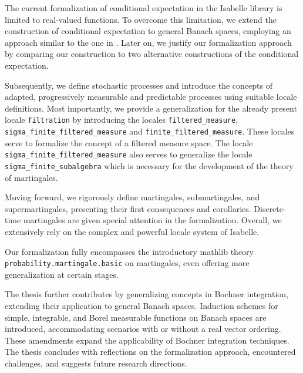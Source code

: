 The current formalization of conditional expectation in the Isabelle library is limited to real-valued functions. To overcome this limitation, we extend the construction of conditional expectation to general Banach spaces, employing an approach similar to the one in \cite{Hytoenen_2016}. Later on, we justify our formalization approach by comparing our construction to two alternative constructions of the conditional expectation.

Subsequently, we define stochastic processes and introduce the concepts of adapted, progressively measurable and predictable processes using suitable locale definitions. Most importantly, we provide a generalization for the already present locale \lstinline{filtration} by introducing the locales \lstinline{filtered_measure}, \lstinline{sigma_finite_filtered_measure} and  \lstinline{finite_filtered_measure}. These locales serve to formalize the concept of a filtered measure space. The locale \lstinline{sigma_finite_filtered_measure} also serves to generalize the locale \lstinline{sigma_finite_subalgebra} which is necessary for the development of the theory of martingales. 

Moving forward, we rigorously define martingales, submartingales, and supermartingales, presenting their first consequences and corollaries. Discrete-time martingales are given special attention in the formalization. Overall, we extensively rely on the complex and powerful locale system of Isabelle.

Our formalization fully encompasses the introductory \textsf{mathlib} theory \texttt{probability.mar\-tingale.basic} on martingales, even offering more generalization at certain stages.

The thesis further contributes by generalizing concepts in Bochner integration, extending their application to general Banach spaces. Induction schemes for simple, integrable, and Borel measurable functions on Banach spaces are introduced, accommodating scenarios with or without a real vector ordering. These amendments expand the applicability of Bochner integration techniques.
The thesis concludes with reflections on the formalization approach, encountered challenges, and suggests future research directions.